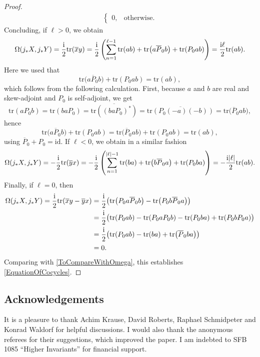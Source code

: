 \documentclass[pdftex]{sigma}
\numberwithin{equation}{section}
\newcommand{\tr}{\mathrm{tr}}
\newcommand{\id}{\mathrm{id}}
\begin{document}
\begin{proof}
\begin{align*}
\begin{cases}
 0, & \text{otherwise}.
 \end{cases}	
\end{align*}
Concluding, if $\ell >0$, we obtain
\begin{equation*}
 \Omega(j_*X, j_*Y) = \frac{{\rm i}}{2} \tr(\overline{x}y) = \frac{{\rm i}}{2} \left(\sum_{n=1}^{\ell-1}\tr(ab) + \tr\big(a\overline{P}_0 b\big) + \tr(P_0ab) \right) = \frac{{\rm i}\ell}{2}\tr(ab).
\end{equation*}
Here we used that
\[\tr\big(a\overline{P}_0 b\big) + \tr(P_0ab) = \tr(ab),\] which follows from the following calculation.
First, because $a$ and $b$ are real and skew-adjoint and $P_0$ is self-adjoint, we get
\begin{equation*}
 	\tr(aP_0b) = \tr(baP_0) = \overline{\tr((baP_0)^*)} = \overline{\tr(P_0 (-a)(-b))} = \tr\big(\overline{P}_0ab\big),
\end{equation*}
hence
\begin{equation*}
	\tr\big(a\overline{P}_0 b\big) + \tr(P_0ab) = \tr\big(\overline{P}_0 ab\big) + \tr(P_0ab) = \tr(ab),
\end{equation*}
using $\overline{P}_0 + P_0 = \id$.
If $\ell < 0$, we obtain in a similar fashion
\begin{equation*}
 \Omega(j_*X, j_*Y) = -\frac{{\rm i}}{2} \tr(\overline{y}x) = -\frac{{\rm i}}{2} \left(\sum_{n=1}^{|\ell|-1}\tr(ba) + \tr\big(b\overline{P}_0 a\big) + \tr(P_0ba) \right) = -\frac{{\rm i}|\ell|}{2}\tr(ab).
\end{equation*}
Finally, if $\ell=0$, then
\begin{equation*}
\begin{aligned}
 	\Omega(j_*X, j_*Y) = \frac{{\rm i}}{2} \tr(\overline{x}y - \overline{y}x)
 	&= \frac{{\rm i}}{2} \big(\tr\big(P_0 a\overline{P}_0b\big) - \tr\big(P_0 b\overline{P}_0a\big)\big)\\
 	&= \frac{{\rm i}}{2} \big(\tr(P_0 ab) - \tr(P_0 a{P}_0b) - \tr(P_0 ba) + \tr(P_0 bP_0a)\big) \\
 	&=\frac{{\rm i}}{2} \big(\tr(P_0 ab) - \tr(ba) + \tr\big(\overline{P}_0 ba\big) \big) \\
 	& = 0.
\end{aligned}
\end{equation*}
Comparing with \eqref{ToCompareWithOmega}, this establishes \eqref{EquationOfCocycles}.
\end{proof}

\subsection*{Acknowledgements}
It is a pleasure to thank Achim Krause, David Roberts, Raphael Schmidpeter and Konrad Waldorf for helpful discussions.
I would also thank the anonymous referees for their suggestions, which improved the paper.
I am indebted to SFB 1085 ``Higher Invariants'' for financial support.
\end{document}
